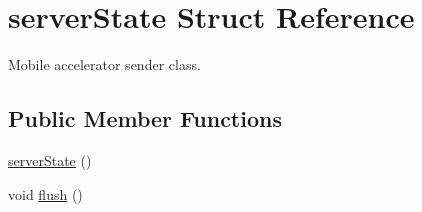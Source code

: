 \hypertarget{structserverState}{\section{server\-State \-Struct \-Reference}
\label{structserverState}
}


\-Mobile accelerator sender class.  


\subsection*{\-Public \-Member \-Functions}
\begin{DoxyCompactItemize}
\item 
\hyperlink{structserverState_a22224a01dd0315452cbdfd75104fcc95}{server\-State} ()
\item 
void \hyperlink{structserverState_ade1b73163870d9cae8510c29b5915d36}{flush} ()
\end{DoxyCompactItemize}
